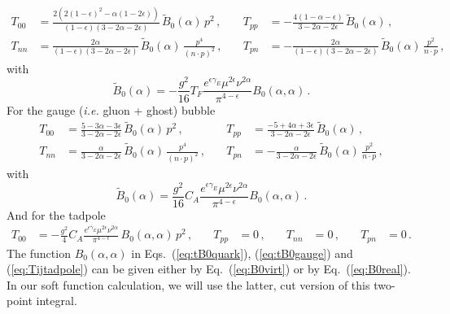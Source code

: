 \documentclass[a4paper,11pt]{article}
\newcommand{\ie}{{\it i.e. }}
\numberwithin{equation}{section}
\begin{document}
\begin{align}
  \label{eq:Tijquark}
  T_{00} &= \frac{2 \left(2 (1-\epsilon)^2-\alpha  (1-2 \epsilon)\right)}
  {(1-\epsilon) (3-2 \alpha -2 \epsilon)}
  \, \tilde B_0(\alpha)\, p^2\,,
  &\quad
  T_{pp} &= -\frac{4 (1-\alpha -\epsilon)}{3-2 \alpha -2 \epsilon} 
  \, \tilde B_0(\alpha)\,, \\
  T_{nn} &= 
  \frac{2 \alpha }{(1-\epsilon) (3-2 \alpha -2 \epsilon)}
  \, \tilde B_0(\alpha)\,
  \frac{p^4}{\left(n\cdot p\right)^2}\,,
  &\quad
  T_{pn} &= 
  -\frac{2 \alpha}{(1-\epsilon) (3-2 \alpha -2 \epsilon) }
  \, \tilde B_0(\alpha)\,
  \frac{p^2}{n\cdot p}
  \,,
  \nonumber
\end{align}
%
with
%
\begin{equation}
  \tilde B_0(\alpha) = -\frac{g^2}{16} T_F 
  \frac{e^{\epsilon\gamma_E}\mu^{2\epsilon}\nu^{2\alpha}}{\pi^{4-\epsilon}}
  B_0(\alpha,\alpha)\,.
  \label{eq:tB0quark}
\end{equation}
%
For the gauge (\ie gluon + ghost) bubble
%
\begin{align}
  T_{00} &= 
  \frac{5 - 3 \alpha - 3 \epsilon}{3 - 2 \alpha - 2 \epsilon}
  \, \tilde B_0(\alpha)\, p^2\,,
  &\quad
  T_{pp} &= \frac{-5 + 4 \alpha + 3 \epsilon}{3 - 2 \alpha - 2 \epsilon}  
  \, \tilde B_0(\alpha)\,, \\
  T_{nn} &= 
  \frac{\alpha }{3 - 2 \alpha - 2 \epsilon}
  \, \tilde B_0(\alpha)\,
  \frac{p^4}{\left(n\cdot p\right)^2}\,,
  &\quad
  T_{pn} &= 
  -\frac{\alpha}{3 - 2 \alpha - 2 \epsilon }
  \, \tilde B_0(\alpha)\,
  \frac{p^2}{n\cdot p}
  \,,
  \nonumber
\end{align}
%
with
%
\begin{equation}
  \tilde B_0(\alpha) = 
  \frac{g^2}{16} C_A 
  \frac{e^{\epsilon\gamma_E}\mu^{2\epsilon}\nu^{2\alpha}}{\pi^{4-\epsilon}}
  B_0(\alpha,\alpha)\,.
  \label{eq:tB0gauge}
\end{equation}
%
And for the tadpole
%
\begin{align}
  T_{00} &= 
  -\frac{g^2}{4} C_A 
  \frac{e^{\epsilon\gamma_E}\mu^{2\epsilon}\nu^{2\alpha}}{\pi^{4-\epsilon}}\,
  B_0(\alpha,\alpha)\, p^2\,,
  &\quad
  T_{pp} &= 0 \,, 
  &\quad
  T_{nn} &= 0 \,,
  &\quad
  T_{pn} &= 0 \,.
  \label{eq:Tijtadpole}
\end{align}
%
The function $B_0(\alpha,\alpha)$ in Eqs.~(\ref{eq:tB0quark}),
(\ref{eq:tB0gauge}) and (\ref{eq:Tijtadpole}) can be given either by
Eq.~(\ref{eq:B0virt}) or by Eq.~(\ref{eq:B0real}). In our soft function
calculation, we will use the latter, cut version of this two-point integral.
\end{document}
